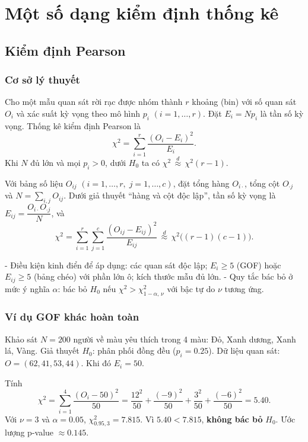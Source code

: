 \chapter{Một số dạng kiểm định thống kê}

\section{Kiểm định Pearson}

\subsection{Cơ sở lý thuyết}
\begin{dn}
Cho một mẫu quan sát rời rạc được nhóm thành $r$ khoảng (bin) với số quan sát $O_i$ và xác suất kỳ vọng theo mô hình $p_i$ $(i=1,\ldots,r)$. Đặt $E_i=Np_i$ là tần số kỳ vọng. Thống kê kiểm định Pearson là
\[
\chi^2=\sum_{i=1}^{r}\frac{(O_i-E_i)^2}{E_i}.
\]
Khi $N$ đủ lớn và mọi $p_i>0$, dưới $H_0$ ta có $\chi^2\,\overset{d}{\approx}\,\chi^2(r-1)$.
\end{dn}

\begin{dn}
Với bảng số liệu $O_{ij}$ $(i=1,\ldots,r,\; j=1,\ldots,c)$, đặt tổng hàng $O_{i\cdot}$, tổng cột $O_{\cdot j}$ và $N=\sum_{i,j}O_{ij}$. Dưới giả thuyết “hàng và cột độc lập”, tần số kỳ vọng là $E_{ij}=\dfrac{O_{i\cdot}O_{\cdot j}}{N}$, và
\[\chi^2=\sum_{i=1}^{r}\sum_{j=1}^{c}\frac{(O_{ij}-E_{ij})^2}{E_{ij}}\,\overset{d}{\approx}\,\chi^2\big((r-1)(c-1)\big).
\]
\end{dn}

\begin{tinhchat}
- Điều kiện kinh điển để áp dụng: các quan sát độc lập; $E_i\ge5$ (GOF) hoặc $E_{ij}\ge5$ (bảng chéo) với phần lớn ô; kích thước mẫu đủ lớn.
- Quy tắc bác bỏ ở mức ý nghĩa $\alpha$: bác bỏ $H_0$ nếu $\chi^2>\chi^2_{1-\alpha,\,\nu}$ với bậc tự do $\nu$ tương ứng.
\end{tinhchat}

\subsection{Ví dụ GOF khác hoàn toàn}
Khảo sát $N=200$ người về màu yêu thích trong 4 màu: Đỏ, Xanh dương, Xanh lá, Vàng. Giả thuyết $H_0$: phân phối đồng đều ($p_i=0.25$). Dữ liệu quan sát: $O=(62,41,53,44)$. Khi đó $E_i=50$.

Tính
\[
\chi^2=\sum_{i=1}^{4}\frac{(O_i-50)^2}{50}=\frac{12^2}{50}+\frac{(-9)^2}{50}+\frac{3^2}{50}+\frac{(-6)^2}{50}=5.40.
\]
Với $\nu=3$ và $\alpha=0.05$, $\chi^2_{0.95,3}=7.815$. Vì $5.40<7.815$, \textbf{không bác bỏ} $H_0$. Ước lượng p-value $\approx0.145$.

